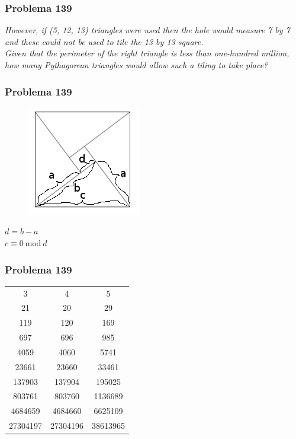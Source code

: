 \documentclass{beamer}
\begin{document}
\begin{frame}
    \frametitle{Problema 139}

    \begin{center}
        \textit{
            However, if (5, 12, 13) triangles were used then the hole would measure 7 by 7 and these could not be used to tile the 13 by 13 square.\\
            Given that the perimeter of the right triangle is less than one-hundred million, how many Pythagorean triangles would allow such a tiling to take place?
        }
    \end{center}
\end{frame}

\begin{frame}
    \frametitle{Problema 139}

    \begin{figure}[htpb]
        \centering
        \includegraphics[width=0.4\linewidth]{images/p139_2.png}
    \end{figure}

    \begin{center}
        $d=b-a$ \\
        $c \equiv 0 \: \text{mod}\: d$
    \end{center}

\end{frame}

\begin{frame}
    \frametitle{Problema 139}

    \begin{table}[htpb]
        \centering
        \begin{tabular}{c c c}
            3        & 4        & 5 \\
            21       & 20       & 29 \\
            119      & 120      & 169 \\
            697      & 696      & 985  \\
            4059     & 4060     & 5741  \\
            23661    & 23660    & 33461  \\
            137903   & 137904   & 195025  \\
            803761   & 803760   & 1136689  \\
            4684659  & 4684660  & 6625109   \\
            27304197 & 27304196 & 38613965
        \end{tabular}
    \end{table}
\end{frame}
\end{document}
